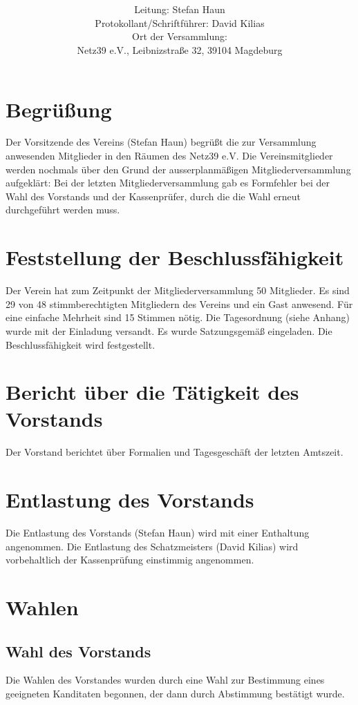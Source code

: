 \documentclass[a4paper,12pt,titlepage]{scrartcl}
\title{ \logo \\ \vspace{0.2\baselineskip} \thetitle}
\author{
Leitung: Stefan Haun \\
Protokollant/Schriftführer: David Kilias \\
Ort der Versammlung:\\ Netz39 e.V., Leibnizstraße 32, 39104 Magdeburg \\
}
\date{\displaydate{date}} %
\begin{document}
\maketitle
\tableofcontents

\clearpage
\section*{Begrüßung}
Der Vorsitzende des Vereins (Stefan Haun) begrüßt die zur Versammlung anwesenden Mitglieder in den Räumen des Netz39 e.V.
Die Vereinsmitglieder werden nochmals über den Grund der ausserplanmäßigen Mitgliederversammlung aufgeklärt: Bei der letzten Mitgliederversammlung gab es Formfehler bei der Wahl des Vorstands und der Kassenprüfer, durch die die Wahl erneut durchgeführt werden muss.

\section{Feststellung der Beschlussfähigkeit}
Der Verein hat zum Zeitpunkt der Mitgliederversammlung 50 Mitglieder. Es sind 29 von 48 stimmberechtigten Mitgliedern des Vereins und ein Gast anwesend. Für eine einfache Mehrheit sind 15 Stimmen nötig. Die Tagesordnung (siehe Anhang) wurde mit der Einladung versandt. Es wurde Satzungsgemäß eingeladen. Die Beschlussfähigkeit wird festgestellt.

\section{Bericht über die Tätigkeit des Vorstands}
Der Vorstand berichtet über Formalien und Tagesgeschäft der letzten Amtszeit.

\section{Entlastung des Vorstands}
Die Entlastung des Vorstands (Stefan Haun) wird mit einer Enthaltung angenommen.
Die Entlastung des Schatzmeisters (David Kilias) wird vorbehaltlich der Kassenprüfung einstimmig angenommen.

\section{Wahlen}
\subsection{Wahl des Vorstands}
Die Wahlen des Vorstandes wurden durch eine Wahl zur Bestimmung eines geeigneten Kanditaten begonnen, der dann durch Abstimmung bestätigt wurde.
\end{document}
